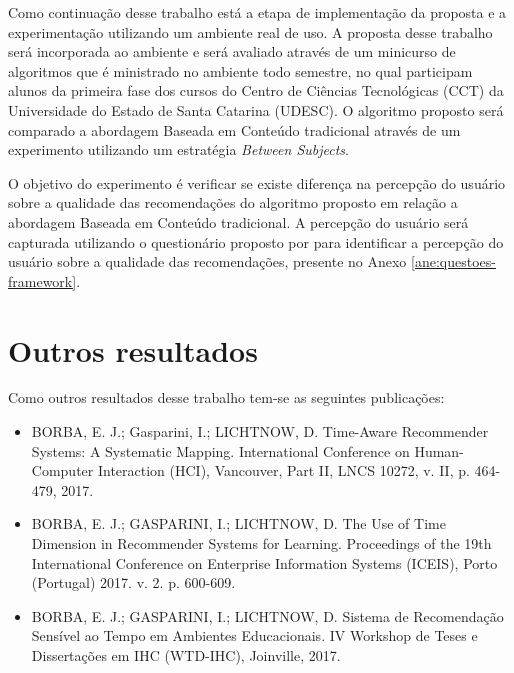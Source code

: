 Como continuação desse trabalho está a etapa de implementação da proposta e a experimentação utilizando um ambiente
real de uso. A proposta desse trabalho será incorporada ao ambiente \adaptweb e será avaliado através de um minicurso de
algoritmos que é ministrado no ambiente todo semestre, no qual participam alunos da primeira fase dos cursos
do Centro de Ciências Tecnológicas (CCT) da Universidade do Estado de Santa Catarina (UDESC). O algoritmo proposto será
comparado a abordagem Baseada em Conteúdo tradicional através de um experimento utilizando um estratégia \textit{Between Subjects}.

O objetivo do experimento é verificar se existe diferença na percepção do usuário sobre a qualidade das recomendações do
algoritmo proposto em relação a abordagem Baseada em Conteúdo tradicional. A percepção do usuário será capturada utilizando
o questionário proposto por  para identificar a percepção do usuário sobre a qualidade das recomendações,
presente no Anexo \ref{ane:questoes-framework}.

\section{Outros resultados}

Como outros resultados desse trabalho tem-se as seguintes publicações:

\begin{itemize}
\item BORBA, E. J.; Gasparini, I.; LICHTNOW, D. Time-Aware Recommender Systems: A Systematic Mapping. International Conference on Human-Computer Interaction (HCI), Vancouver, Part II, LNCS 10272, v. II, p. 464-479, 2017.
\item BORBA, E. J.; GASPARINI, I.; LICHTNOW, D. The Use of Time Dimension in Recommender Systems for Learning. Proceedings of the 19th International Conference on Enterprise Information Systems (ICEIS), Porto (Portugal) 2017. v. 2. p. 600-609.
\item BORBA, E. J.; GASPARINI, I.; LICHTNOW, D. Sistema de Recomendação Sensível ao Tempo em Ambientes Educacionais. IV Workshop de Teses e Dissertações em IHC (WTD-IHC), Joinville, 2017.
\end{itemize}
